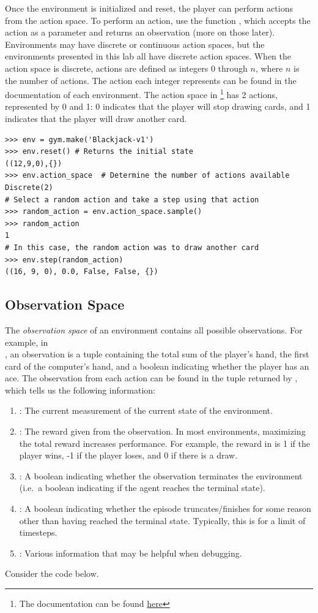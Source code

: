 Once the environment is initialized and reset, the player can perform actions from the action space.
To perform an action, use the function , which accepts the action as a parameter and returns an observation (more on those later).
Environments may have discrete or continuous action spaces, but the environments presented in this lab all have discrete action spaces.
When the action space is discrete, actions are defined as integers 0 through $n$, where $n$ is the number of actions.
The action each integer represents can be found in the documentation of each environment.
The action space in \footnote{The documentation can be found \href{https://gymnasium.farama.org/environments/toy_text/blackjack/}{here}} has 2 actions, represented by 0 and 1: 0 indicates that the player will stop drawing cards, and 1 indicates that the player will draw another card.

\begin{lstlisting}
>>> env = gym.make('Blackjack-v1')
>>> env.reset() # Returns the initial state
((12,9,0),{})
>>> env.action_space  # Determine the number of actions available
Discrete(2)
# Select a random action and take a step using that action
>>> random_action = env.action_space.sample()
>>> random_action
1
# In this case, the random action was to draw another card
>>> env.step(random_action)
((16, 9, 0), 0.0, False, False, {})
\end{lstlisting}

\subsection*{Observation Space}
The \emph{observation space} of an environment contains all possible observations.
For example, in \\ , an observation is a tuple containing the total sum of the player's hand, the first card of the computer's hand, and a boolean indicating whether the player has an ace.
The observation from each action can be found in the tuple returned by , which tells us the following information:
\begin{enumerate}
\item {}: The current measurement of the current state of the environment.
\item {}: The reward given from the observation. 
In most environments, maximizing the total reward increases performance.
For example, the reward in  is 1 if the player wins, -1 if the player loses, and 0 if there is a draw.
\item {}: A boolean indicating whether the observation terminates the environment (i.e.\ a boolean indicating if the agent reaches the terminal state).
\item {}: A boolean indicating whether the episode truncates/finishes for some reason other than having reached the terminal state.
Typically, this is for a limit of timesteps.
\item {}: Various information that may be helpful when debugging.
\end{enumerate}
Consider the code below.

